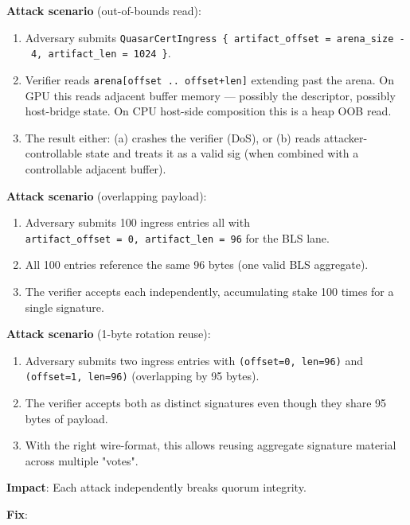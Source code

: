 \documentclass[
]{article}
\providecommand{\tightlist}{%
  \setlength{\itemsep}{0pt}\setlength{\parskip}{0pt}}
\begin{document}
\textbf{Attack scenario} (out-of-bounds read):

\begin{enumerate}
\def\labelenumi{\arabic{enumi}.}
\tightlist
\item
  Adversary submits
  \texttt{QuasarCertIngress\ \{\ artifact\_offset\ =\ arena\_size\ -\ 4,\ artifact\_len\ =\ 1024\ \}}.
\item
  Verifier reads \texttt{arena{[}offset\ ..\ offset+len{]}} extending
  past the arena. On GPU this reads adjacent buffer memory --- possibly
  the descriptor, possibly host-bridge state. On CPU host-side
  composition this is a heap OOB read.
\item
  The result either: (a) crashes the verifier (DoS), or (b) reads
  attacker-controllable state and treats it as a valid sig (when
  combined with a controllable adjacent buffer).
\end{enumerate}

\textbf{Attack scenario} (overlapping payload):

\begin{enumerate}
\def\labelenumi{\arabic{enumi}.}
\tightlist
\item
  Adversary submits 100 ingress entries all with
  \texttt{artifact\_offset\ =\ 0,\ artifact\_len\ =\ 96} for the BLS
  lane.
\item
  All 100 entries reference the same 96 bytes (one valid BLS aggregate).
\item
  The verifier accepts each independently, accumulating stake 100 times
  for a single signature.
\end{enumerate}

\textbf{Attack scenario} (1-byte rotation reuse):

\begin{enumerate}
\def\labelenumi{\arabic{enumi}.}
\tightlist
\item
  Adversary submits two ingress entries with
  \texttt{(offset=0,\ len=96)} and \texttt{(offset=1,\ len=96)}
  (overlapping by 95 bytes).
\item
  The verifier accepts both as distinct signatures even though they
  share 95 bytes of payload.
\item
  With the right wire-format, this allows reusing aggregate signature
  material across multiple "votes".
\end{enumerate}

\textbf{Impact}: Each attack independently breaks quorum integrity.

\textbf{Fix}:
\end{document}
